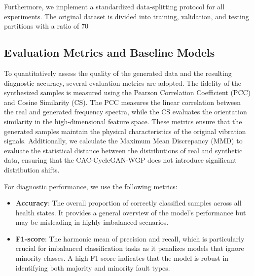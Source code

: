 \documentclass[twocolumn]{IEEEtran}
\begin{document}
Furthermore, we implement a standardized data-splitting protocol for all experiments. The original dataset is divided into training, validation, and testing partitions with a ratio of 70%

\subsection{Evaluation Metrics and Baseline Models}
To quantitatively assess the quality of the generated data and the resulting diagnostic accuracy, several evaluation metrics are adopted. 
The fidelity of the synthesized samples is measured using the Pearson Correlation Coefficient (PCC) and Cosine Similarity (CS). The PCC measures the linear correlation between the real and generated frequency spectra, while the CS evaluates the orientation similarity in the high-dimensional feature space. These metrics ensure that the generated samples maintain the physical characteristics of the original vibration signals. Additionally, we calculate the Maximum Mean Discrepancy (MMD) to evaluate the statistical distance between the distributions of real and synthetic data, ensuring that the CAC-CycleGAN-WGP does not introduce significant distribution shifts.

For diagnostic performance, we use the following metrics:
\begin{itemize}
    \item \textbf{Accuracy}: The overall proportion of correctly classified samples across all health states. It provides a general overview of the model's performance but may be misleading in highly imbalanced scenarios.
    \item \textbf{F1-score}: The harmonic mean of precision and recall, which is particularly crucial for imbalanced classification tasks as it penalizes models that ignore minority classes. A high F1-score indicates that the model is robust in identifying both majority and minority fault types.
\end{itemize}
\end{document}

